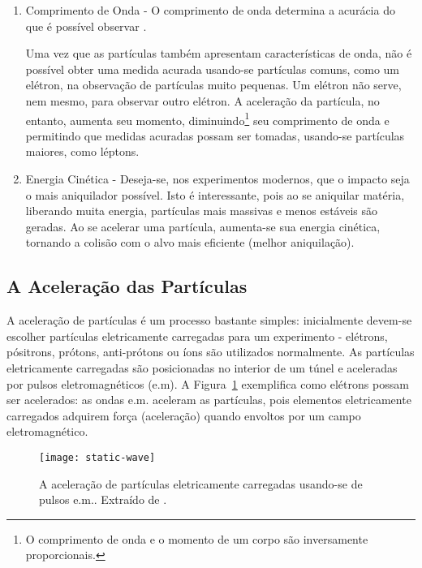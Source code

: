 \begin{enumerate}
\item Comprimento de Onda - O comprimento de onda determina a acurácia do que
é possível observar \cite{partadv}.

Uma vez que as par\-tí\-culas tam\-bém apresentam caracte\-rís\-ticas de onda,
não é pos\-sí\-vel obter uma medida acurada usando-se partículas comuns, como
um e\-lé\-tron, na observação de partículas muito pequenas. Um elétron não
serve, nem mesmo, para observar outro elétron. A aceleração da partícula, no
entanto, aumenta seu momento, diminuindo\footnote{O comprimento de onda e o
momento de um corpo são inversamente proporcionais.} seu comprimento de onda e
permitindo que medidas acuradas possam ser tomadas, usando-se partículas
maiores, como léptons.

\item Energia Cinética - Deseja-se, nos experimentos modernos, que o impacto
seja o mais aniquilador possível. Isto é interessante, pois ao se aniquilar
matéria, liberando muita energia, partículas mais massivas e menos estáveis são
geradas. Ao se acelerar uma partícula, aumenta-se sua energia cinética,
tornando a colisão com o alvo mais eficiente (melhor aniquilação).
\end{enumerate}

\subsection{A Aceleração das Partículas}

A aceleração de partículas  é um processo
bastante simples: inicialmente devem-se escolher partículas eletricamente
carregadas para um experimento - e\-lé\-trons, pó\-sitrons, pró\-tons,
anti-\-pró\-tons ou íons são utilizados normalmente. As par\-tí\-culas
eletricamente carregadas são posicionadas no interior de um túnel e
aceleradas por pulsos eletromagnéticos
(e.m). A Figura~\ref{fig:acelera} exemplifica como elétrons possam ser
acelerados: as ondas e.m. aceleram as partículas, pois elementos eletricamente
carregados adquirem força (aceleração) quando envoltos por um campo
eletromagnético.

\begin{figure}
\begin{center}
\texttt{[image: static-wave]}
\end{center}
\caption[A aceleração de partículas.]{A aceleração de partículas eletricamente
carregadas usando-se de pulsos e.m.. Extraído de \cite{partadv}.}
\label{fig:acelera}
\end{figure}

